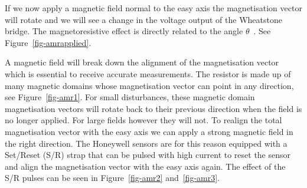 If we now apply a magnetic field normal to the easy axis the magnetisation vector will rotate and we will see a change in the voltage output of the Wheatstone bridge. The magnetoresistive effect is directly related to the angle $\theta$~\cite{hmc1001}. See Figure~\ref{fig-amrapplied}.

A magnetic field will break down the alignment of the magnetisation vector which is essential to receive accurate measurements. The resistor is made up of many magnetic domains whose magnetisation vector can point in any direction, see Figure~\ref{fig-amr1}. For small disturbances, these magnetic domain magnetisation vectors will rotate back to their previous direction when the field is no longer applied. For large fields however they will not. To realign the total magnetisation vector with the easy axis we can apply a strong magnetic field in the right direction. The Honeywell sensors are for this reason equipped with a Set/Reset (S/R) strap that can be pulsed with high current to reset the sensor and align the magnetisation vector with the easy axis again. The effect of the S/R pulses can be seen in Figure~\ref{fig-amr2} and~\ref{fig-amr3}.
 
